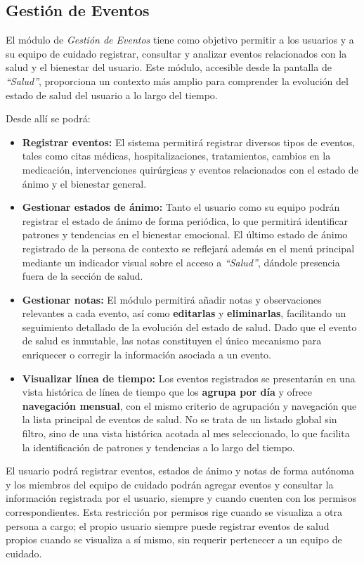 \documentclass[a4paper,12pt]{article}
\begin{document}
    \subsection{Gestión de Eventos}
    \par El módulo de \textit{Gestión de Eventos} tiene como objetivo permitir a los usuarios y a su equipo de cuidado registrar, consultar y analizar eventos relacionados con la salud y el bienestar del usuario. Este módulo, accesible desde la pantalla de \textit{``Salud''}, proporciona un contexto más amplio para comprender la evolución del estado de salud del usuario a lo largo del tiempo.
    \par Desde allí se podrá:
    \begin{itemize}
        \item \textbf{Registrar eventos:} El sistema permitirá registrar diversos tipos de eventos, tales como citas médicas, hospitalizaciones, tratamientos, cambios en la medicación, intervenciones quirúrgicas y eventos relacionados con el estado de ánimo y el bienestar general.
        \item \textbf{Gestionar estados de ánimo:} Tanto el usuario como su equipo podrán registrar el estado de ánimo de forma periódica, lo que permitirá identificar patrones y tendencias en el bienestar emocional. El último estado de ánimo registrado de la persona de contexto se reflejará además en el menú principal mediante un indicador visual sobre el acceso a \textit{``Salud''}, dándole presencia fuera de la sección de salud.
        \item \textbf{Gestionar notas:} El módulo permitirá añadir notas y observaciones relevantes a cada evento, así como \textbf{editarlas} y \textbf{eliminarlas}, facilitando un seguimiento detallado de la evolución del estado de salud. Dado que el evento de salud es inmutable, las notas constituyen el único mecanismo para enriquecer o corregir la información asociada a un evento.
        \item \textbf{Visualizar línea de tiempo:} Los eventos registrados se presentarán en una vista histórica de línea de tiempo que los \textbf{agrupa por día} y ofrece \textbf{navegación mensual}, con el mismo criterio de agrupación y navegación que la lista principal de eventos de salud. No se trata de un listado global sin filtro, sino de una vista histórica acotada al mes seleccionado, lo que facilita la identificación de patrones y tendencias a lo largo del tiempo.
    \end{itemize}
    \par El usuario podrá registrar eventos, estados de ánimo y notas de forma autónoma y los miembros del equipo de cuidado podrán agregar eventos y consultar la información registrada por el usuario, siempre y cuando cuenten con los permisos correspondientes. Esta restricción por permisos rige cuando se visualiza a otra persona a cargo; el propio usuario siempre puede registrar eventos de salud propios cuando se visualiza a sí mismo, sin requerir pertenecer a un equipo de cuidado.
\end{document}
